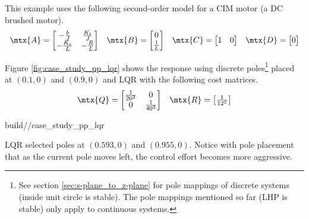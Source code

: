 This example uses the following second-order \gls{model} for a CIM motor (a DC
brushed motor).
\begin{align*}
  \begin{array}{cccc}
    \mtx{A} = \begin{bmatrix}
      -\frac{b}{J} & \frac{K_t}{J} \\
      -\frac{K_e}{L} & -\frac{R}{L}
    \end{bmatrix} &
    \mtx{B} = \begin{bmatrix}
      0 \\
      \frac{1}{L}
    \end{bmatrix} &
    \mtx{C} = \begin{bmatrix}
      1 & 0
    \end{bmatrix} &
    \mtx{D} = \begin{bmatrix}
      0
    \end{bmatrix}
  \end{array}
\end{align*}

Figure \ref{fig:case_study_pp_lqr} shows the response using discrete
poles\footnote{See section \ref{sec:s-plane_to_z-plane} for pole mappings of
discrete systems (inside unit circle is stable). The pole mappings mentioned so
far (LHP is stable) only apply to continuous systems.} placed at $(0.1, 0)$ and
$(0.9, 0)$ and LQR with the following cost matrices.
\begin{align*}
  \begin{array}{cc}
    \mtx{Q} = \begin{bmatrix}
      \frac{1}{20^2} & 0 \\
      0 & \frac{1}{40^2}
    \end{bmatrix} &
    \mtx{R} = \begin{bmatrix}
      \frac{1}{12^2}
    \end{bmatrix}
  \end{array}
\end{align*}
\begin{svg}{build/\chapterpath/case_study_pp_lqr}
  \caption{Second-order CIM motor response with pole placement and LQR}
  \label{fig:case_study_pp_lqr}
\end{svg}

LQR selected poles at $(0.593, 0)$ and $(0.955, 0)$. Notice with pole placement
that as the current pole moves left, the \gls{control effort} becomes more
aggressive.
